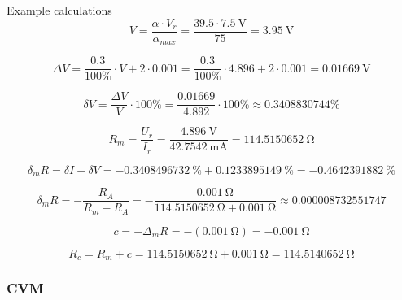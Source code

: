 Example calculations 
\begin{equation}
	V = \frac{\alpha\cdot V_{r}}{\alpha_{max}} = \frac{39.5\cdot \SI{7.5}{\volt}}{75} = \SI{3.95}{\volt}
	\label{eq:digital_indirect}
\end{equation}

\begin{equation}
	\Delta V = \frac{0.3}{100\unit{\percent}} \cdot V + 2 \cdot 0.001 = \frac{0.3}{100\unit{\percent}} \cdot 4.896 + 2 \cdot 0.001 = \SI{0.01669}{\volt}
	\label{eq:digital_indirect}
\end{equation}

\begin{equation}
	\delta V = \frac{\Delta V}{V}\cdot 100\unit{\percent} = \frac{0.01669}{4.892}\cdot 100\unit{\percent} \approx 0.3408830744\unit{\percent}
	\label{eq:digital_indirect}
\end{equation}

\begin{equation}
	R_m = \frac{U_r}{ I_r} = \frac{\SI{4.896}{\volt}} {\SI{42.7542}{\milli\ampere}} = \SI{114.5150652}{\ohm}
	\label{eq:digital_indirect}
\end{equation}

\begin{equation}
	\delta_m R = \delta I + \delta V = -\SI{0.3408496732}{\percent} + \SI{0.1233895149}{\percent} = -\SI{0.4642391882}{\percent}
	\label{eq:digital_indirect}
\end{equation}

\begin{equation}
	\delta_m R = -\frac{R_A}{R_m - R_A} = -\frac{\SI{0.001}{\ohm}}{\SI{114.5150652}{\ohm} + \SI{0.001}{\ohm}} \approx 0.000008732551747
	\label{eq:digital_indirect}
\end{equation}

\begin{equation}
	c = -\Delta_m R = -(\SI{0.001}{\ohm}) = -\SI{0.001}{\ohm}
	\label{eq:digital_indirect}
\end{equation}

\begin{equation}
	R_c = R_m + c = \SI{114.5150652}{\ohm} + \SI{0.001}{\ohm} = \SI{114.5140652}{\ohm}
	\label{eq:analog_V_c}
\end{equation}

\subsubsection*{CVM}

